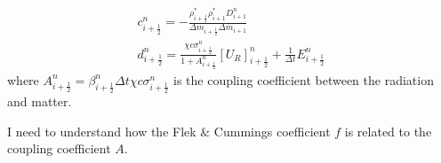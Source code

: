 \documentclass[11pt]{article}
\begin{document}
\begin{enumerate}
\begin{gather}
    \boxed{c_{i+\frac{1}{2}}^n = -\frac{\rho_{i+\frac{1}{2}}^{*} \rho_{i+1}^* D_{i+1}^n}{\Delta m_{i+\frac{1}{2}} \Delta m_{i+1}}} \\
    \boxed{d_{i+\frac{1}{2}}^n = \frac{\chi c \sigma_{i+\frac{1}{2}}^{n}}{1 + A_{i+\frac{1}{2}}^n}[U_R]_{i+\frac{1}{2}}^n + \frac{1}{\Delta t}E_{i+\frac{1}{2}}^n}
  \end{gather}
  where $A_{i+\frac{1}{2}}^n = \beta_{i+\frac{1}{2}}^{n} \Delta t \chi c \sigma_{i+\frac{1}{2}}^{n}$ is the coupling coefficient between the radiation and matter.
  \begin{notebox}
    I need to understand how the Flek \& Cummings coefficient $f$ is related to the coupling coefficient $A$.
  \end{notebox}
\end{enumerate}
\end{document}
